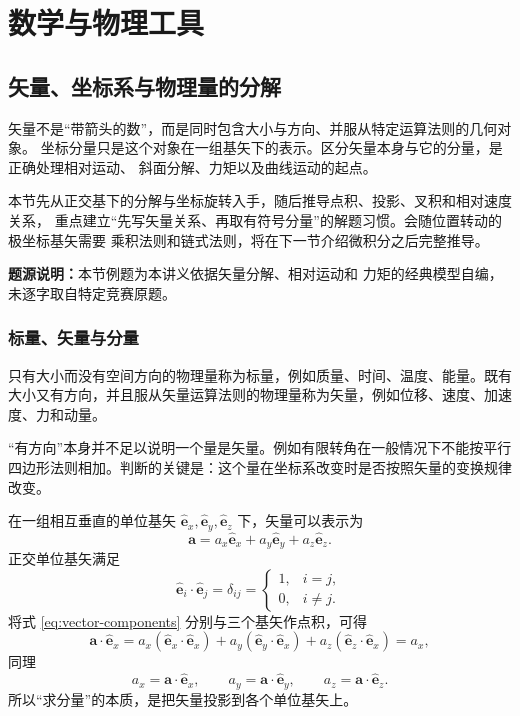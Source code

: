 \documentclass[UTF8,zihao=-4,oneside,openany]{ctexbook}
\numberwithin{equation}{section}
\newcommand{\vect}[1]{\bm{#1}}
\newcommand{\uvec}[1]{\hat{\vect{#1}}}
\begin{document}
\setcounter{page}{1}
\setcounter{chapter}{0}
\chapter{数学与物理工具}
\setcounter{section}{1}
\fi
\ifdefined\MASTERBOOK\clearpage\fi
\section{矢量、坐标系与物理量的分解}

矢量不是“带箭头的数”，而是同时包含大小与方向、并服从特定运算法则的几何对象。
坐标分量只是这个对象在一组基矢下的表示。区分矢量本身与它的分量，是正确处理相对运动、
斜面分解、力矩以及曲线运动的起点。

本节先从正交基下的分解与坐标旋转入手，随后推导点积、投影、叉积和相对速度关系，
重点建立“先写矢量关系、再取有符号分量”的解题习惯。会随位置转动的极坐标基矢需要
乘积法则和链式法则，将在下一节介绍微积分之后完整推导。

{\small\color{TextGray}\noindent\textbf{题源说明：}本节例题为本讲义依据矢量分解、相对运动和
力矩的经典模型自编，未逐字取自特定竞赛原题。\par}

\subsection{标量、矢量与分量}

只有大小而没有空间方向的物理量称为标量，例如质量、时间、温度、能量。既有大小又有方向，并且服从矢量运算法则的物理量称为矢量，例如位移、速度、加速度、力和动量。

“有方向”本身并不足以说明一个量是矢量。例如有限转角在一般情况下不能按平行四边形法则相加。判断的关键是：这个量在坐标系改变时是否按照矢量的变换规律改变。

在一组相互垂直的单位基矢 $\uvec e_x,\uvec e_y,\uvec e_z$ 下，矢量可以表示为
\begin{equation}
  \vect a=a_x\uvec e_x+a_y\uvec e_y+a_z\uvec e_z.
  \label{eq:vector-components}
\end{equation}
正交单位基矢满足
\[
  \uvec e_i\cdot\uvec e_j=\delta_{ij}
  =\begin{cases}
    1,&i=j,\\
    0,&i\ne j.
  \end{cases}
\]
将式 \eqref{eq:vector-components} 分别与三个基矢作点积，可得
\[
  \vect a\cdot\uvec e_x
  =a_x(\uvec e_x\cdot\uvec e_x)
   +a_y(\uvec e_y\cdot\uvec e_x)
   +a_z(\uvec e_z\cdot\uvec e_x)=a_x,
\]
同理
\begin{equation}
  a_x=\vect a\cdot\uvec e_x,\qquad
  a_y=\vect a\cdot\uvec e_y,\qquad
  a_z=\vect a\cdot\uvec e_z.
  \label{eq:components-by-projection}
\end{equation}
所以“求分量”的本质，是把矢量投影到各个单位基矢上。
\end{document}
